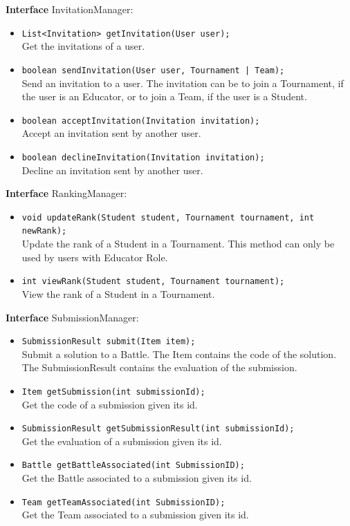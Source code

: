 \textbf{Interface} InvitationManager:
\begin{itemize}
    \item \texttt{List<Invitation> getInvitation(User user);}
    \\ Get the invitations of a user.
    \item \texttt{boolean sendInvitation(User user, Tournament | Team);}
    \\ Send an invitation to a user. The invitation can be to join a Tournament, if the user is an Educator, or to join a Team, if the user is a Student.
    \item \texttt{boolean acceptInvitation(Invitation invitation);}
    \\ Accept an invitation sent by another user.
    \item \texttt{boolean declineInvitation(Invitation invitation);}
    \\ Decline an invitation sent by another user.
\end{itemize}

\textbf{Interface} RankingManager:
\begin{itemize}
    \item \texttt{void updateRank(Student student, Tournament tournament, int newRank);}
    \\ Update the rank of a Student in a Tournament. This method can only be used by users with Educator Role.
    \item \texttt{int viewRank(Student student, Tournament tournament);}
    \\ View the rank of a Student in a Tournament.
\end{itemize}

\textbf{Interface} SubmissionManager:
\begin{itemize}
    \item \texttt{SubmissionResult submit(Item item);}
    \\ Submit a solution to a Battle. The Item contains the code of the solution. The SubmissionResult contains the evaluation of the submission.
    \item \texttt{Item getSubmission(int submissionId);}
    \\ Get the code of a submission given its id.
    \item \texttt{SubmissionResult getSubmissionResult(int submissionId);}
    \\ Get the evaluation of a submission given its id.
    \item \texttt{Battle getBattleAssociated(int SubmissionID);}
    \\ Get the Battle associated to a submission given its id.
    \item \texttt{Team getTeamAssociated(int SubmissionID);}
    \\ Get the Team associated to a submission given its id.
\end{itemize}


